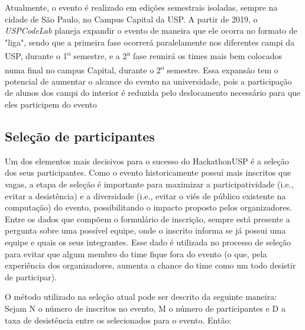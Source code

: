 \documentclass[10pt,twoside,a4paper]{article}
\begin{document}
    Atualmente, o evento é realizado em edições semestrais isoladas, sempre na cidade de São Paulo, no Campus Capital da USP. A partir de 2019, o \textit{USPCodeLab} planeja expandir o evento de maneira que ele ocorra no formato de "liga", sendo que a primeira fase ocorrerá paralelamente nos diferentes campi da USP, durante o 1\textsuperscript{o} semestre, e a 2\textsuperscript{a} fase reunirá os times mais bem colocados numa final no campus Capital, durante o 2\textsuperscript{o} semestre. Essa expansão tem o potencial de aumentar o alcance do evento na universidade, pois a participação de alunos dos campi do interior é reduzida pelo deslocamento necessário para que eles participem do evento
    
  \subsection{Seleção de participantes}
  \label{selection}
    
    Um dos elementos mais decisivos para o sucesso do HackathonUSP é a seleção dos seus participantes. Como o evento historicamente possui mais inscritos que vagas, a etapa de seleção é importante para maximizar a participatividade (i.e., evitar a desistência) e a diversidade (i.e., evitar o viés de público existente na computação) do evento, possibilitando o impacto proposto pelos organizadores. Entre os dados que compõem o formulário de inscrição, sempre está presente a pergunta sobre uma possível equipe, onde o inscrito informa se já possui uma equipe e quais os seus integrantes. Esse dado é utilizada no processo de seleção para evitar que algum membro do time fique fora do evento (o que, pela experiência dos organizadores, aumenta a chance do time como um todo desistir de participar).
    
    O método utilizado na seleção atual pode ser descrito da seguinte maneira: \\
    
    Sejam N o número de inscritos no evento, M o número de participantes e D a taxa de desistência entre os selecionados para o evento. Então:
    
\end{document}
